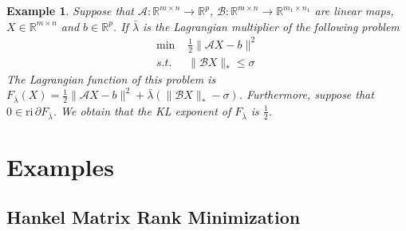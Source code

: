 \documentclass{article}
\numberwithin{equation}{section}
\newtheorem{example}{Example}[theorem]
\begin{document}
    \begin{example}
        Suppose that $\mathcal{A}: \mathbb{R}^{m\times n}\rightarrow \mathbb{R}^p$, 
        $\mathcal{B}: \mathbb{R}^{m\times n} \rightarrow \mathbb{R}^{m_1\times n_1}$ are linear maps, 
        $X\in \mathbb{R}^{m\times n}$ and $b\in \mathbb{R}^p$. If $\bar{\lambda}$ is the Lagrangian multiplier of 
        the following problem
        \begin{align} 
            \min\limits \hspace{4pt}&\frac{1}{2}\|\mathcal{A}X-b\rVert^2 \nonumber\\
            s.t. \hspace{4pt} &\| \mathcal{B}X \rVert_* \leq \sigma   \nonumber
        \end{align}
        The Lagrangian function of this problem is $F_{\bar{\lambda}}(X) = \frac{1}{2}\|\mathcal{A}X-b\rVert^2
        +\bar{\lambda}(\|\mathcal{B}X\rVert_*-\sigma)$. Furthermore, suppose that 
        $0 \in \mathrm{ri} \hspace{2pt} \partial F_{\bar{\lambda}}$. We obtain that the KL 
        exponent of $F_{\bar{\lambda}}$ is $\frac{1}{2}$. 
    \end{example}





\section{Examples}
\subsection{Hankel Matrix Rank Minimization}
\end{document}
